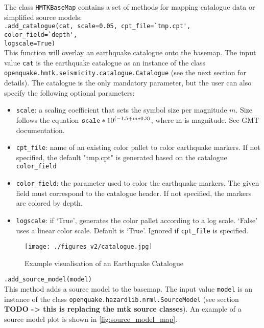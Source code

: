 \noindent The class \verb=HMTKBaseMap= contains a set of methods for mapping catalogue data or simplified source models:\\

\noindent \verb;.add_catalogue(cat, scale=0.05, cpt_file=`tmp.cpt', color_field=`depth',;\\
		\verb;logscale=True);\\

\noindent This function will overlay an earthquake catalogue onto the basemap. The input value \verb=cat= is the earthquake catalogue as an instance of the class \\\verb=openquake.hmtk.seismicity.catalogue.Catalogue= (see the next section for details). The catalogue is the only mandatory parameter, but the user can also specify the following optional parameters:\\

\begin{itemize}
	\item \verb=scale=: a scaling coefficient that sets the symbol size per magnitude $m$. Size follows the equation ${\verb=scale=}*10^{(-1.5+m*0.3)}$, where m is magnitude. See GMT documentation.
	\item \verb=cpt_file=: name of an existing color pallet to color earthquake markers. If not specified, the default "tmp.cpt" is generated based on the catalogue \verb=color_field=
	\item \verb=color_field=: the parameter used to color the earthquake markers. The given field must correspond to the catalogue header. If not specified, the markers are colored by depth.
	\item \verb=logscale=: if `True', generates the color pallet according to a log scale. `False' uses a linear color scale. Default is `True'. Ignored if \verb=cpt_file= is specified.\\
\end{itemize}


\begin{figure}[htb]
  \centering
      \texttt{[image: ./figures\_v2/catalogue.jpg]}
  \caption{Example visualisation of an Earthquake Catalogue}
  \label{fig:eqcat_simple}
\end{figure}


\noindent \verb;.add_source_model(model);\\

\noindent This method adds a source model to the basemap. The input value \verb=model= is an instance of the class \verb=openquake.hazardlib.nrml.SourceModel= (see section \textbf{TODO -> this is replacing the mtk source classes}). An example of a source model plot is shown in \ref{fig:source_model_map}.


